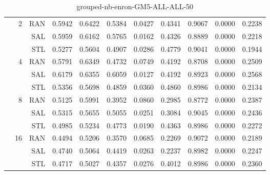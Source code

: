 \begin{center}
\begin{table}[htbp]
\begin{center}
\begin{tabular}{ | r | r | r | r | r | r | r | r | r | r | r |}
 & \multirow{3}{*}{2} & RAN & 0.5942 & 0.6422 & 0.5384 & 0.0427 & 0.4341 & 0.9067 & 0.0000 & 0.2238\\ \cline{3-11}
 &   & SAL & 0.5959 & 0.6162 & 0.5765 & 0.0162 & 0.4326 & 0.8889 & 0.0000 & 0.2218\\ \cline{3-11}
 &   & STL & 0.5277 & 0.5604 & 0.4907 & 0.0286 & 0.4779 & 0.9041 & 0.0000 & 0.1944\\ \cline{2-11}
 & \multirow{3}{*}{4} & RAN & 0.5791 & 0.6349 & 0.4732 & 0.0749 & 0.4192 & 0.8708 & 0.0000 & 0.2509\\ \cline{3-11}
 &   & SAL & 0.6179 & 0.6355 & 0.6059 & 0.0127 & 0.4192 & 0.8923 & 0.0000 & 0.2568\\ \cline{3-11}
 &   & STL & 0.5356 & 0.5698 & 0.4859 & 0.0360 & 0.4860 & 0.8986 & 0.0000 & 0.2134\\ \cline{2-11}
 & \multirow{3}{*}{8} & RAN & 0.5125 & 0.5991 & 0.3952 & 0.0860 & 0.2985 & 0.8772 & 0.0000 & 0.2387\\ \cline{3-11}
 &   & SAL & 0.5315 & 0.5655 & 0.5055 & 0.0251 & 0.3084 & 0.9045 & 0.0000 & 0.2436\\ \cline{3-11}
 &   & STL & 0.4985 & 0.5234 & 0.4773 & 0.0190 & 0.4363 & 0.8986 & 0.0000 & 0.2272\\ \cline{2-11}
 & \multirow{3}{*}{16} & RAN & 0.4494 & 0.5206 & 0.3570 & 0.0685 & 0.2269 & 0.9072 & 0.0000 & 0.2189\\ \cline{3-11}
 &   & SAL & 0.4740 & 0.5064 & 0.4419 & 0.0263 & 0.2237 & 0.8982 & 0.0000 & 0.2247\\ \cline{3-11}
 &   & STL & 0.4717 & 0.5027 & 0.4357 & 0.0276 & 0.4012 & 0.8986 & 0.0000 & 0.2360\\ \cline{2-11}
\hline
\end{tabular}
\caption{grouped-nb-enron-GM5-ALL-ALL-50}
\end{center}
 \end{table}
\end{center}

